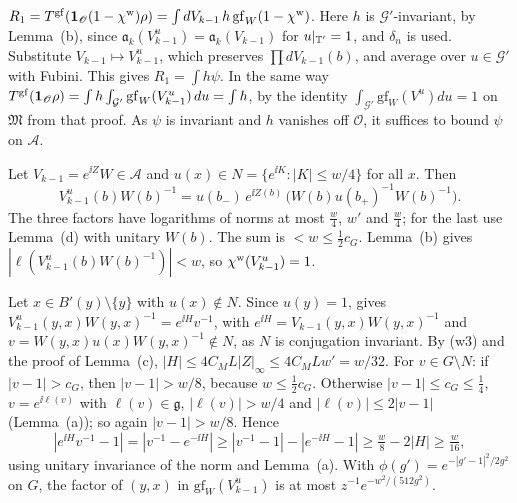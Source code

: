 \begin{detail}\label{d11a:A14h}
\begin{step}
$R_1=T^{\rm gf}(\mathbf 1_{\mathscr O}(1-\chi^{\rm w})\rho)=\int dV_{k-1}\,h\,\mathrm{gf}_W(1-\chi^{\rm w})$. Here $h$ is $\mathcal G'$-invariant, by Lemma~(b), since $\mathfrak a_k(V_{k-1}^u)=\mathfrak a_k(V_{k-1})$ for $u|_{\mathbb T'}=1$, and $\delta_n$ is used. Substitute $V_{k-1}\mapsto V_{k-1}^u$, which preserves $\prod dV_{k-1}(b)$, and average over $u\in\mathcal G'$ with Fubini. This gives $R_1=\int h\psi$. In the same way $T^{\rm gf}(\mathbf 1_{\mathscr O}\rho)=\int h\int_{\mathcal G'}\mathrm{gf}_W(V_{k-1}^u)\,du=\int h$, by the identity $\int_{\mathcal G'}\mathrm{gf}_W(V^u)du=1$ on $\mathfrak M$ from that proof. As $\psi$ is invariant and $h$ vanishes off $\mathscr O$, it suffices to bound $\psi$ on $\mathscr A$.
\end{step}
\begin{step}
Let $V_{k-1}=e^{\ii Z}W\in\mathscr A$ and $u(x)\in N=\{e^{\ii K}:|K|\le w/4\}$ for all $x$. Then
\[
V_{k-1}^u(b)W(b)^{-1}=u(b_-)\,e^{\ii Z(b)}\,\big(W(b)u(b_+)^{-1}W(b)^{-1}\big).
\]
The three factors have logarithms of norms at most $\frac w4$, $w'$ and $\frac w4$; for the last use Lemma~(d) with unitary $W(b)$. The sum is $<w\le\frac12c_G$. Lemma~(b) gives $|\ell(V_{k-1}^u(b)W(b)^{-1})|<w$, so $\chi^{\rm w}(V_{k-1}^u)=1$.
\end{step}
\begin{step}
Let $x\in B'(y)\setminus\{y\}$ with $u(x)\notin N$. Since $u(y)=1$,  gives $V_{k-1}^u(y,x)W(y,x)^{-1}=e^{\ii H}v^{-1}$, with $e^{\ii H}=V_{k-1}(y,x)W(y,x)^{-1}$ and $v=W(y,x)u(x)W(y,x)^{-1}\notin N$, as $N$ is conjugation invariant. By (w3) and the proof of Lemma~(c), $|H|\le4C_ML|Z|_\infty\le4C_MLw'=w/32$. For $v\in G\setminus N$: if $|v-1|>c_G$, then $|v-1|>w/8$, because $w\le\frac12c_G$. Otherwise $|v-1|\le c_G\le\frac14$, $v=e^{\ii\ell(v)}$ with $\ell(v)\in\mathfrak g$, $|\ell(v)|>w/4$ and $|\ell(v)|\le2|v-1|$ (Lemma~(a)); so again $|v-1|>w/8$. Hence
\[
|e^{\ii H}v^{-1}-1|=|v^{-1}-e^{-\ii H}|\ge|v^{-1}-1|-|e^{-\ii H}-1|\ge\tfrac w8-2|H|\ge\tfrac w{16},
\]
using unitary invariance of the norm and Lemma~(a). With $\phi(g')=e^{-|g'-1|^2/2g^2}$ on $G$, the factor of $(y,x)$ in $\mathrm{gf}_W(V_{k-1}^u)$ is at most $z^{-1}e^{-w^2/(512g^2)}$.

\end{step}
\end{detail}
